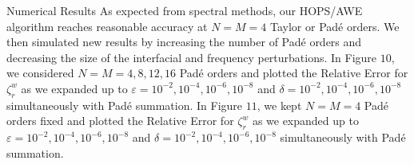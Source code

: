 \begin{section}{Numerical Results}
\vspace{-2mm}
As expected from spectral methods, our HOPS/AWE algorithm reaches reasonable accuracy at $N=M=4$ Taylor or Padé orders. We then simulated new results by increasing the number of Padé orders and decreasing the size of the interfacial and frequency perturbations. In Figure $10$, we considered $N=M=4,8,12,16$ Padé orders and plotted the Relative Error for $\zeta^w_r$ as we expanded up to $\varepsilon = 10^{-2},10^{-4},10^{-6},10^{-8}$ and $\delta = 10^{-2},10^{-4},10^{-6},10^{-8}$ simultaneously with Padé summation. In Figure $11$, we kept  $N=M=4$ Padé orders fixed and plotted the Relative Error for $\zeta^w_r$ as we expanded up to $\varepsilon= 10^{-2},10^{-4},10^{-6},10^{-8}$ and $\delta = 10^{-2},10^{-4},10^{-6},10^{-8}$ simultaneously with Padé summation.


\end{section}
